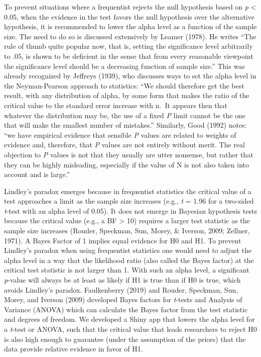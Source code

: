 \documentclass[
  english,
  ,man, a4paper,floatsintext]{apa6}
\begin{document}
To prevent situations where a frequentist rejects the null hypothesis based on \emph{p} \textless{} 0.05, when the evidence in the test favors the null hypothesis over the alternative hypothesis, it is recommended to lower the alpha level as a function of the sample size. The need to do so is discussed extensively by Leamer (1978). He writes ``The rule of thumb quite popular now, that is, setting the significance level arbitrarily to .05, is shown to be deficient in the sense that from every reasonable viewpoint the significance level should be a decreasing function of sample size.'' This was already recognized by Jeffreys (1939), who discusses ways to set the alpha level in the Neyman-Pearson approach to statistics: ``We should therefore get the best result, with any distribution of alpha, by some form that makes the ratio of the critical value to the standard error increase with n.~It appears then that whatever the distribution may be, the use of a fixed \emph{P} limit cannot be the one that will make the smallest number of mistakes.'' Similarly, Good (1992) notes: ``we have empirical evidence that sensible \emph{P} values are related to weights of evidence and, therefore, that \emph{P} values are not entirely without merit. The real objection to \emph{P} values is not that they usually are utter nonsense, but rather that they can be highly misleading, especially if the value of N is not also taken into account and is large.''

Lindley's paradox emerges because in frequentist statistics the critical value of a test approaches a limit as the sample size increases (e.g., \emph{t} = 1.96 for a two-sided \emph{t}-test with an alpha level of 0.05). It does not emerge in Bayesian hypothesis tests because the critical value (e.g., a BF \textgreater{} 10) requires a larger test statistic as the sample size increases (Rouder, Speckman, Sun, Morey, \& Iverson, 2009; Zellner, 1971). A Bayes Factor of 1 implies equal evidence for H0 and H1. To prevent Lindley's paradox when using frequentist statistics one would need to adjust the alpha level in a way that the likelihood ratio (also called the Bayes factor) at the critical test statistic is not larger than 1. With such an alpha level, a significant \emph{p}-value will always be at least as likely if H1 is true than if H0 is true, which avoids Lindley's paradox. Faulkenberry (2019) and Rouder, Speckman, Sun, Morey, and Iverson (2009) developed Bayes factors for \emph{t}-tests and Analysis of Variance (ANOVA) which can calculate the Bayes factor from the test statistic and degrees of freedom. We developed a Shiny app that lowers the alpha level for a \emph{t}-test or ANOVA, such that the critical value that leads researchers to reject H0 is also high enough to guarantee (under the assumption of the priors) that the data provide relative evidence in favor of H1.
\end{document}
